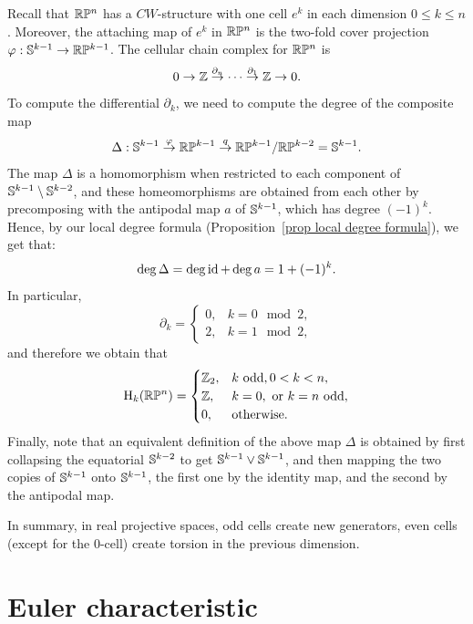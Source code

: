 \begin{example}
    Recall that $\mathbb{R}\mathbb{P}^n$ has a $CW$-structure with one cell $e^k$ in each dimension $0\leq k\leq n$. Moreover, the attaching map of $e^k$ in $\mathbb{R}\mathbb{P}^n$ is the two-fold cover projection $\varphi:\mathbb{S}^{k-1}\to \mathbb{R}\mathbb{P}^{k-1}$. The cellular chain complex for $\mathbb{R}\mathbb{P}^n$ is
    \[0\to \mathbb{Z}\overset{\partial_n}{\to}\cdots \overset{\partial_1}{\to}\mathbb{Z}\to 0.\]
    To compute the differential $\partial_k$, we need to compute the degree of the composite map
    \[\Delta:\mathbb{S}^{k-1}\overset{\varphi}{\to}\mathbb{R}\mathbb{P}^{k-1}\overset{q}{\to}\mathbb{R}\mathbb{P}^{k-1}\slash \mathbb{R}\mathbb{P}^{k-2}=\mathbb{S}^{k-1}.\]
    The map $\Delta$ is a homomorphism when restricted to each component of $\mathbb{S}^{k-1}\setminus \mathbb{S}^{k-2}$, and these homeomorphisms are obtained from each other by precomposing with the antipodal map $a$ of $\mathbb{S}^{k-1}$, which has degree $(-1)^k$. Hence, by our local degree formula (Proposition~\ref{prop local degree formula}), we get that:
    \[\deg \Delta=\deg\operatorname{id}+\deg a=1+(-1)^k.\label{eq degree of cells in RPn}\]
    In particular,
    \[\partial_k=\begin{cases}
        0,& k=0\mod 2,\\
        2,& k=1\mod 2,
    \end{cases}\]
    and therefore we obtain that
    \[
        \mathrm{H}_k(\mathbb{R}\mathbb{P}^n)=
        \begin{cases}
            \mathbb{Z}_2,& k\text{ odd}, 0<k<n,\\
            \mathbb{Z},& k=0, \text{ or }k=n \text{ odd},\\
            0,&\text{otherwise}.
        \end{cases}
    \]
    Finally, note that an equivalent definition of the above map $\Delta$ is obtained by first collapsing the equatorial $\mathbb{S}^{k-2}$ to get $\mathbb{S}^{k-1}\vee \mathbb{S}^{k-1}$, and then mapping the two copies of $\mathbb{S}^{k-1}$ onto $\mathbb{S}^{k-1}$, the first one by the identity map, and the second by the antipodal map.

    In summary, in real projective spaces, odd cells create new generators, even cells (except for the 0-cell) create torsion in the previous dimension.
\end{example}





\section{Euler characteristic}

